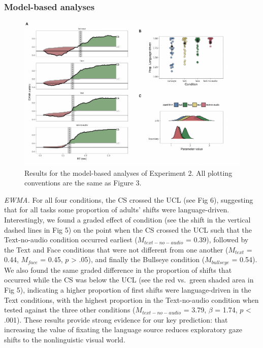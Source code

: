 \documentclass[english,floatsintext,man]{apa6}
\theoremstyle{definition}
\theoremstyle{definition}
\theoremstyle{definition}
\theoremstyle{remark}
\begin{document}
\hypertarget{model-based-analyses-1}{%
\subsubsection{Model-based analyses}\label{model-based-analyses-1}}

\begin{figure}[tb]

{\centering \includegraphics[width=0.9\linewidth]{figs/text-model-plots-1} 

}

\caption{Results for the model-based analyses of Experiment 2. All plotting conventions are the same as Figure 3.}\label{fig:text-model-plots}
\end{figure}

\emph{EWMA.} For all four conditions, the CS crossed the UCL (see Fig
6), suggesting that for all tasks some proportion of adults' shifts were
language-driven. Interestingly, we found a graded effect of condition
(see the shift in the vertical dashed lines in Fig 5) on the point when
the CS crossed the UCL such that the Text-no-audio condition occurred
earliest (\(M_{text-no-audio}\) = 0.39), followed by the Text and Face
conditions that were not different from one another (\(M_{text}\) =
0.44, \(M_{face}\) = 0.45, \(p\) \textgreater{} .05), and finally the
Bullseye condition (\(M_{bullseye}\) = 0.54). We also found the same
graded difference in the proportion of shifts that occurred while the CS
was below the UCL (see the red vs.~green shaded area in Fig 5),
indicating a higher proportion of first shifts were language-driven in
the Text conditions, with the highest proportion in the Text-no-audio
condition when tested against the three other conditions
(\(M_{text-no-audio}\) = 3.79, \(\beta\) = 1.74, \(p\) \textless{}
.001). These results provide strong evidence for our key prediction:
that increasing the value of fixating the language source reduces
exploratory gaze shifts to the nonlinguistic visual world.
\end{document}
